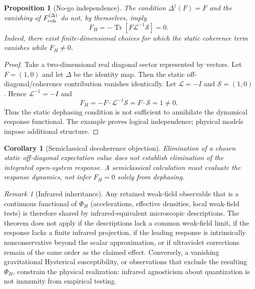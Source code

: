 \documentclass[11pt]{article}
\newtheorem{corollary}[theorem]{Corollary}
\newtheorem{proposition}[theorem]{Proposition}
\theoremstyle{definition}
\theoremstyle{remark}
\newtheorem{remark}[theorem]{Remark}
\newcommand{\Tr}{\operatorname{Tr}}
\begin{document}
\begin{proposition}[No-go independence]\label{prop:independence}
The condition $\Delta^\dagger(F)=F$ and the vanishing of $F_{\rm coh}^{(\Delta)}$ do not, by themselves, imply
\begin{equation}
 F_H=-\Tr\!\left[F\mathcal L^{-1}\mathcal S\right]=0.
\end{equation}
Indeed, there exist finite-dimensional choices for which the static coherence term vanishes while $F_H\neq0$.
\end{proposition}
\begin{proof}
Take a two-dimensional real diagonal sector represented by vectors. Let $F=(1,0)$ and let $\Delta$ be the identity map. Then the static off-diagonal/coherence contribution vanishes identically. Let $\mathcal L=-I$ and $\mathcal S=(1,0)$. Hence $\mathcal L^{-1}=-I$ and
\begin{equation}
 F_H=-F\cdot\mathcal L^{-1}\mathcal S=F\cdot\mathcal S=1\neq0.
\end{equation}
Thus the static dephasing condition is not sufficient to annihilate the dynamical response functional. The example proves logical independence; physical models impose additional structure.
\end{proof}

\begin{corollary}[Semiclassical decoherence objection]
Elimination of a chosen static off-diagonal expectation value does not establish elimination of the integrated open-system response. A semiclassical calculation must evaluate the response dynamics, not infer $F_H=0$ solely from dephasing.
\end{corollary}

\begin{remark}[Infrared inheritance]
Any retained weak-field observable that is a continuous functional of $\Phi_H$ (accelerations, effective densities, local weak-field tests) is therefore shared by infrared-equivalent microscopic descriptions.
The theorem does not apply if the descriptions lack a common weak-field limit, if the response lacks a finite infrared projection, if the leading response is intrinsically nonconservative beyond the scalar approximation, or if ultraviolet corrections remain of the same order as the claimed effect.
Conversely, a vanishing gravitational Hysterical susceptibility, or observations that exclude the resulting $\Phi_H$, constrain the physical realization: infrared agnosticism about quantization is not immunity from empirical testing.
\end{remark}
\end{document}
